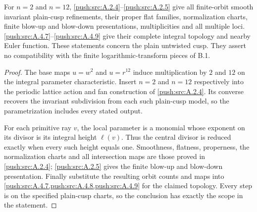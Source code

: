 \begin{corollary}\label{push:src:B.2.2}\label{push:B22}
For $n=2$ and $n=12$, \ref{push:src:A.2.4}--\ref{push:src:A.2.5} give all
finite-orbit smooth invariant plain-cusp refinements,
their proper flat families, normalization charts,
finite blow-up and blow-down presentations,
multiplicities and all multiple loci. \ref{push:src:A.4.7}--\ref{push:src:A.4.9}
give their complete integral topology and nearby
Euler function. These statements concern the plain
untwisted cusp. They assert no compatibility with
the finite logarithmic-transform pieces of B.1.
\end{corollary}
\begin{proof}

The base maps $u=w^2$ and $u=r^{12}$ induce multiplication by
$2$ and $12$ on the integral parameter characteristic. Insert
$n=2$ and $n=12$ respectively into the periodic lattice action
and fan construction of \ref{push:src:A.2.4}. Its converse
recovers the invariant subdivision from each such plain-cusp
model, so the parametrization includes every stated output.

For each primitive ray $v$, the local parameter is a monomial
whose exponent on its divisor is its integral height $\ell(v)$.
Thus the central divisor is reduced exactly when every such
height equals one. Smoothness, flatness, properness, the
normalization charts and all intersection maps are those proved
in \ref{push:src:A.2.4}; \ref{push:src:A.2.5} gives the finite
blow-up and blow-down presentation. Finally substitute the
resulting orbit counts and maps into
\ref{push:src:A.4.7,push:src:A.4.8,push:src:A.4.9} for the
claimed topology. Every step is on the specified plain-cusp
charts, so the conclusion has exactly the scope in the statement.

\end{proof}

